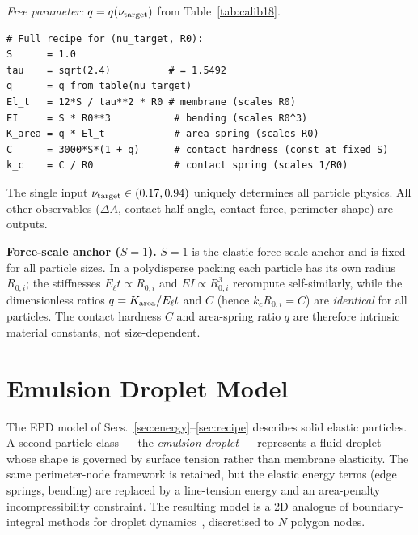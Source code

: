 \documentclass[aps,pre,twocolumn,floatfix,longbibliography]{revtex4-2}
\newcommand{\dA}{\Delta A}
\begin{document}
\textit{Free parameter:} $q = q(\nu_{\rm target})$ from Table~\ref{tab:calib18}.

\vspace{4pt}
\begin{lstlisting}
# Full recipe for (nu_target, R0):
S      = 1.0
tau    = sqrt(2.4)          # = 1.5492
q      = q_from_table(nu_target)
El_t   = 12*S / tau**2 * R0 # membrane (scales R0)
EI     = S * R0**3           # bending (scales R0^3)
K_area = q * El_t            # area spring (scales R0)
C      = 3000*S*(1 + q)      # contact hardness (const at fixed S)
k_c    = C / R0              # contact spring (scales 1/R0)
\end{lstlisting}

The single input $\nu_{\rm target} \in (0.17, 0.94)$ uniquely determines all
particle physics.  All other observables ($\dA$, contact half-angle, contact
force, perimeter shape) are outputs.

\textbf{Force-scale anchor ($S = 1$).}
$S = 1$ is the elastic force-scale anchor and is fixed for all particle sizes.
In a polydisperse packing each particle has its own radius $R_{0,i}$; the
stiffnesses $E_\ell t \propto R_{0,i}$ and $EI \propto R_{0,i}^3$ recompute
self-similarly, while the dimensionless ratios $q = K_{\rm area}/E_\ell t$ and
$C$ (hence $k_c R_{0,i} = C$) are \emph{identical} for all particles.
The contact hardness $C$ and area-spring ratio $q$ are therefore
intrinsic material constants, not size-dependent.

\section{Emulsion Droplet Model}
\label{sec:emulsion}

The EPD model of Secs.~\ref{sec:energy}--\ref{sec:recipe} describes solid elastic
particles.  A second particle class --- the \emph{emulsion droplet} --- represents a
fluid droplet whose shape is governed by surface tension rather than membrane elasticity.
The same perimeter-node framework is retained, but the elastic energy terms (edge
springs, bending) are replaced by a line-tension energy and an area-penalty
incompressibility constraint.  The resulting model is a 2D analogue of
boundary-integral methods for droplet dynamics~\cite{Pozrikidis1992}, discretised to
$N$ polygon nodes.

\end{document}
